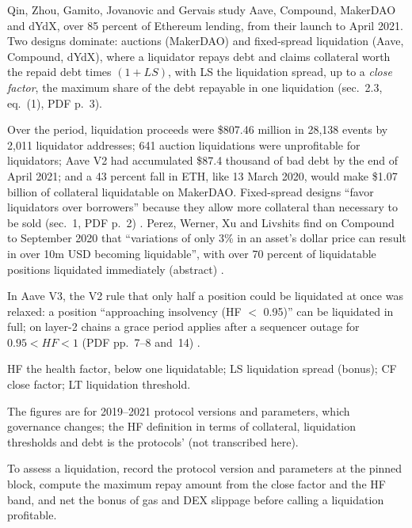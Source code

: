 \begin{qfmechanism}\label{mech:defi-lending-liquidation}
 Qin, Zhou, Gamito, Jovanovic and Gervais study Aave, Compound, MakerDAO and dYdX, over 85 percent of Ethereum lending, from their launch to April 2021. Two designs dominate: auctions (MakerDAO) and fixed-spread liquidation (Aave, Compound, dYdX), where a liquidator repays debt and claims collateral worth the repaid debt times $(1+LS)$, with LS the liquidation spread, up to a \emph{close factor}, the maximum share of the debt repayable in one liquidation (sec.~2.3, eq.~(1), PDF p.~3).

Over the period, liquidation proceeds were \$807.46 million in 28{,}138 events by 2{,}011 liquidator addresses; 641 auction liquidations were unprofitable for liquidators; Aave V2 had accumulated \$87.4 thousand of bad debt by the end of April 2021; and a 43 percent fall in ETH, like 13 March 2020, would make \$1.07 billion of collateral liquidatable on MakerDAO. Fixed-spread designs ``favor liquidators over borrowers'' because they allow more collateral than necessary to be sold (sec.~1, PDF p.~2) \citep[arXiv v2, secs.~1--2, PDF pp.~1--3]{roadmap-defi-liquidations}. Perez, Werner, Xu and Livshits find on Compound to September 2020 that ``variations of only 3\% in an asset's dollar price can result in over 10m USD becoming liquidable'', with over 70 percent of liquidatable positions liquidated immediately (abstract) \citep[arXiv v6, abstract]{oc-perez-knife-edge-2021}.

In Aave V3, the V2 rule that only half a position could be liquidated at once was relaxed: a position ``approaching insolvency (HF $<$ 0.95)'' can be liquidated in full; on layer-2 chains a grace period applies after a sequencer outage for $0.95<HF<1$ (PDF pp.~7--8 and~14) \citep[Aave V3 Technical Paper, 27 January 2022, PDF pp.~7--8 and~14]{al-aave}.

 HF the health factor, below one liquidatable; LS liquidation spread (bonus); CF close factor; LT liquidation threshold.

 The figures are for 2019--2021 protocol versions and parameters, which governance changes; the HF definition in terms of collateral, liquidation thresholds and debt is the protocols' (not transcribed here).

 To assess a liquidation, record the protocol version and parameters at the pinned block, compute the maximum repay amount from the close factor and the HF band, and net the bonus of gas and DEX slippage before calling a liquidation profitable.


\end{qfmechanism}
